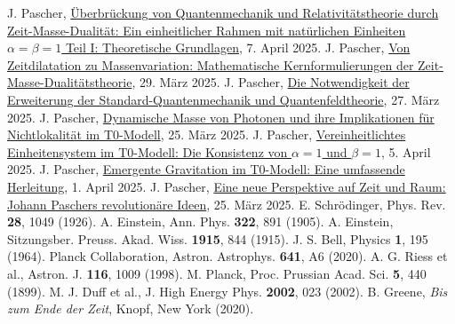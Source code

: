 \documentclass[12pt,a4paper]{article}
\begin{document}
\begin{thebibliography}{99}
		 J. Pascher, \href{https://github.com/jpascher/T0-Time-Mass-Duality/tree/main/2/pdf/Deutsch/QMRelTimeMassPart1.pdf}{Überbrückung von Quantenmechanik und Relativitätstheorie durch Zeit-Masse-Dualität: Ein einheitlicher Rahmen mit natürlichen Einheiten \(\alpha = \beta = 1\) Teil I: Theoretische Grundlagen}, 7. April 2025.
		 J. Pascher, \href{https://github.com/jpascher/T0-Time-Mass-Duality/tree/main/2/pdf/Deutsch/MathZeitMasseLagrange.pdf}{Von Zeitdilatation zu Massenvariation: Mathematische Kernformulierungen der Zeit-Masse-Dualitätstheorie}, 29. März 2025.
		 J. Pascher, \href{https://github.com/jpascher/T0-Time-Mass-Duality/tree/main/2/pdf/Deutsch/NotwendigkeitQMErweiterung.pdf}{Die Notwendigkeit der Erweiterung der Standard-Quantenmechanik und Quantenfeldtheorie}, 27. März 2025.
		 J. Pascher, \href{https://github.com/jpascher/T0-Time-Mass-Duality/tree/main/2/pdf/Deutsch/DynMassePhotonenNichtlokal.pdf}{Dynamische Masse von Photonen und ihre Implikationen für Nichtlokalität im T0-Modell}, 25. März 2025.
		 J. Pascher, \href{https://github.com/jpascher/T0-Time-Mass-Duality/tree/main/2/pdf/Deutsch/Alpha1Beta1Konsistenz.pdf}{Vereinheitlichtes Einheitensystem im T0-Modell: Die Konsistenz von \(\alpha = 1\) und \(\beta = 1\)}, 5. April 2025.
		 J. Pascher, \href{https://github.com/jpascher/T0-Time-Mass-Duality/tree/main/2/pdf/Deutsch/EmergentGravT0.pdf}{Emergente Gravitation im T0-Modell: Eine umfassende Herleitung}, 1. April 2025.
		 J. Pascher, \href{https://github.com/jpascher/T0-Time-Mass-Duality/tree/main/2/pdf/Deutsch/ZeitRaumPascher.pdf}{Eine neue Perspektive auf Zeit und Raum: Johann Paschers revolutionäre Ideen}, 25. März 2025.
		 E. Schrödinger, Phys. Rev. \textbf{28}, 1049 (1926).
		 A. Einstein, Ann. Phys. \textbf{322}, 891 (1905).
		 A. Einstein, Sitzungsber. Preuss. Akad. Wiss. \textbf{1915}, 844 (1915).
		 J. S. Bell, Physics \textbf{1}, 195 (1964).
		 Planck Collaboration, Astron. Astrophys. \textbf{641}, A6 (2020).
		 A. G. Riess et al., Astron. J. \textbf{116}, 1009 (1998).
		 M. Planck, Proc. Prussian Acad. Sci. \textbf{5}, 440 (1899).
		 M. J. Duff et al., J. High Energy Phys. \textbf{2002}, 023 (2002).
		 B. Greene, \textit{Bis zum Ende der Zeit}, Knopf, New York (2020).

\end{thebibliography}
\end{document}
